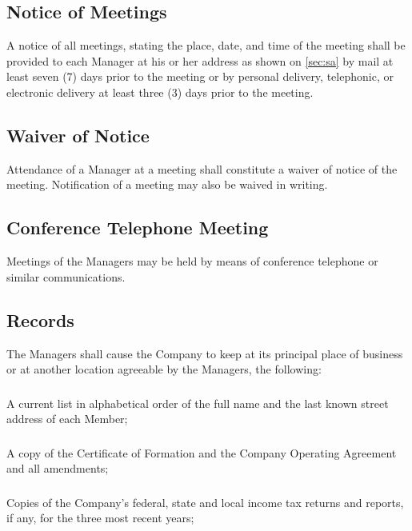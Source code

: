 \documentclass[11pt,onecolumn]{article}
\begin{document}
\subsection{Notice of Meetings}

A notice of all meetings, stating the place, date, and time of the meeting shall be provided to each Manager at his or her address as shown on \autoref{sec:sa} by mail at least seven (7) days prior to the meeting or by personal delivery, telephonic, or electronic delivery at least three (3) days prior to the meeting.

\subsection{Waiver of Notice}

Attendance of a Manager at a meeting shall constitute a waiver of notice of the meeting. Notification of a meeting may also be waived in writing.

\subsection{Conference Telephone Meeting}

Meetings of the Managers may be held by means of conference telephone or similar communications.

\subsection{Records}

The Managers shall cause the Company to keep at its principal place of business or at another location agreeable by the Managers, the following:

\subsubsection{} 

A current list in alphabetical order of the full name and the last known street address of each Member;

\subsubsection{} 

A copy of the Certificate of Formation and the Company Operating Agreement and all amendments;

\subsubsection{}
Copies of the Company's federal, state and local income tax returns and reports, if any, for the three most recent years;
\end{document}
